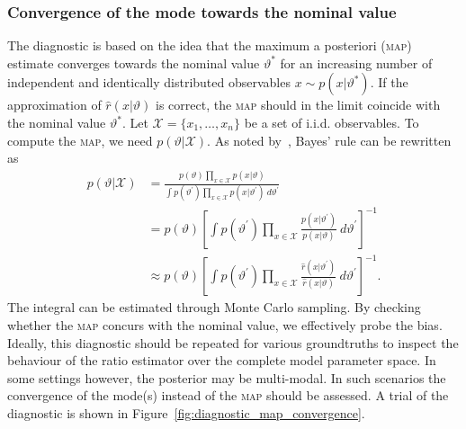 \documentclass[fleqn,usenatbib]{mnras}
\begin{document}
\subsubsection{Convergence of the mode towards the nominal value}
\label{sec:diagnostic_mode}
The diagnostic is based on the idea that the maximum a posteriori (\textsc{map}) estimate
converges towards the nominal value $\vartheta^*$ for an increasing number of independent and
identically distributed observables $x \sim p(x\vert\vartheta^*)$.
If the approximation of $\hat{r}(x\vert\vartheta)$ is correct,
the \textsc{map} should in the limit coincide with the nominal value $\vartheta^*$.
Let $\mathcal{X} = \{x_1,\ldots,x_n\}$ be a set of i.i.d. observables.
To compute the \textsc{map}, we need $p(\vartheta\vert\mathcal{X})$.
As noted by~\citet{Brehmer:2019jyt}, Bayes' rule can be rewritten as
\begin{align}
  p(\vartheta\vert\mathcal{X}) &= \frac{p(\vartheta)\prod_{x\in\mathcal{X}}p(x\vert\vartheta)}{\int p(\vartheta^{'})\prod_{x\in\mathcal{X}}p(x\vert\vartheta^{'})~d\vartheta^{'}}\\
  &= p(\vartheta)\left[\displaystyle\int p(\vartheta^{'})\prod_{x\in\mathcal{X}}\frac{p(x\vert\vartheta^{'})}{p(x\vert\vartheta)}~d\vartheta^{'}\right]^{-1}\\
  &\approx p(\vartheta)\left[\displaystyle\int p(\vartheta^{'})\prod_{x\in\mathcal{X}}\frac{\hat{r}(x\vert\vartheta^{'})}{\hat{r}(x\vert\vartheta)}~d\vartheta^{'}\right]^{-1}.
\end{align}
The integral can be estimated through Monte Carlo sampling.
By checking whether the \textsc{map} concurs with the nominal value, we effectively probe the bias.
Ideally, this diagnostic should be repeated for various groundtruths to
inspect the behaviour of the ratio estimator over the complete model parameter space.
In some settings however, the posterior may be multi-modal.
In such scenarios the convergence of the mode(s) instead of the \textsc{map} should be assessed.
A trial of the diagnostic is shown in Figure~\ref{fig:diagnostic_map_convergence}.
\end{document}
